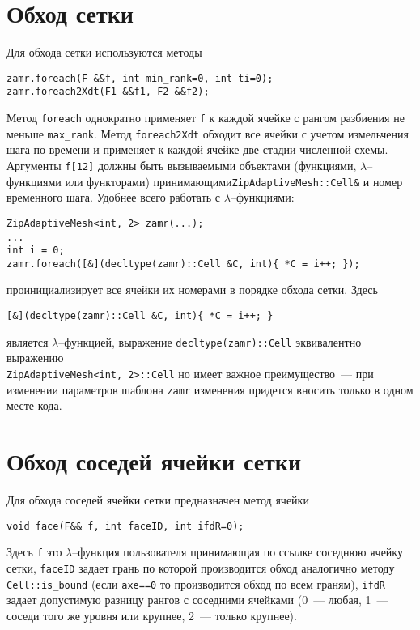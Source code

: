 \documentclass[12pt]{article}
\begin{document}
\section{Обход сетки}
Для обхода сетки используются методы
\begin{verbatim}
zamr.foreach(F &&f, int min_rank=0, int ti=0);
zamr.foreach2Xdt(F1 &&f1, F2 &&f2);
\end{verbatim}
Метод \verb'foreach' однократно применяет \verb'f' к каждой ячейке с рангом разбиения не меньше \verb'max_rank'.
Метод \verb'foreach2Xdt' обходит все ячейки с учетом измельчения шага по времени и применяет к каждой ячейке две стадии численной схемы.
Аргументы \verb'f[12]'
должны быть вызываемыми объектами (функциями, $\lambda$--функциями или функторами) принимающими\linebreak \verb'ZipAdaptiveMesh::Cell&' и номер временного шага.
Удобнее всего работать с $\lambda$--функциями:
\begin{verbatim}
ZipAdaptiveMesh<int, 2> zamr(...);
...
int i = 0;
zamr.foreach([&](decltype(zamr)::Cell &C, int){ *C = i++; });
\end{verbatim}
проинициализирует все ячейки их номерами в порядке обхода сетки. Здесь
\begin{verbatim}
[&](decltype(zamr)::Cell &C, int){ *C = i++; }
\end{verbatim}
является $\lambda$--функцией, выражение \verb'decltype(zamr)::Cell' эквивалентно выражению\\
\verb'ZipAdaptiveMesh<int, 2>::Cell' но имеет важное преимущество~--- при изменении параметров шаблона \verb'zamr'
изменения придется вносить только в одном месте кода.


\section{Обход соседей ячейки сетки}\label{C:face:sec}
Для обхода соседей ячейки сетки предназначен метод ячейки
\begin{verbatim}
void face(F&& f, int faceID, int ifdR=0);
\end{verbatim}
Здесь \verb'f' это $\lambda$--функция пользователя принимающая по ссылке соседнюю ячейку сетки,
\verb'faceID' задает грань по которой производится обход аналогично методу \verb'Cell::is_bound'
(если \verb'axe==0' то производится обход по всем граням), \verb'ifdR' задает допустимую
разницу рангов с соседними ячейками (0~--- любая, 1~--- соседи того же уровня или крупнее, 2~--- только крупнее).
\end{document}
